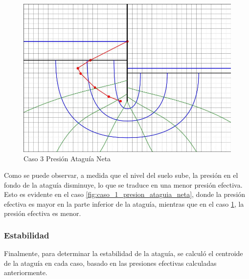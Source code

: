 \begin{figure}[H]
\begin{minipage}{0.32\textwidth}
        \centering
        \includegraphics[width=\textwidth]{GRAFICOS/caso_3_presion_ataguia_neta.jpg}
        \caption{Caso 3 Presión Ataguía Neta}
        \label{fig:caso_3_presion_ataguia_neta}
    \end{minipage}
\end{figure}

Como se puede observar, a medida que el nivel del suelo sube, la presión en el fondo de la ataguía disminuye, lo que se traduce en una menor presión efectiva. Esto es evidente en el caso \ref{fig:caso_1_presion_ataguia_neta}, donde la presión efectiva es mayor en la parte inferior de la ataguía, mientras que en el caso \ref{fig:caso_3_presion_ataguia_neta}, la presión efectiva es menor.

\subsubsection{Estabilidad}
Finalmente, para determinar la estabilidad de la ataguía, se calculó el centroide de la ataguía en cada caso, basado en las presiones efectivas calculadas anteriormente.

